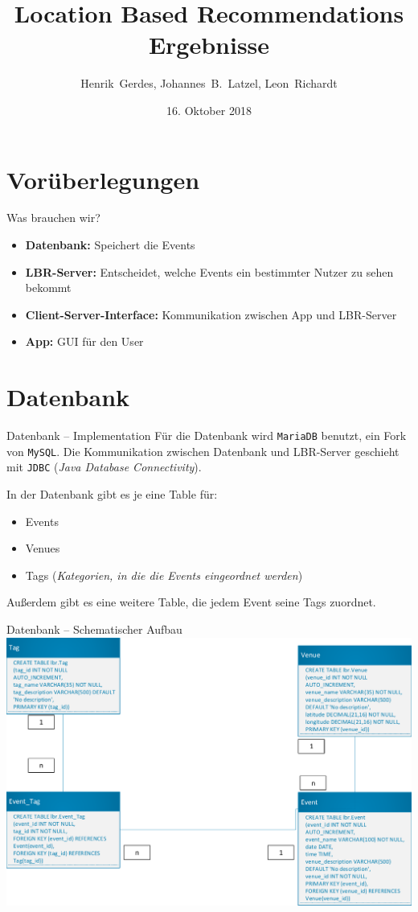 \documentclass{beamer}
\title{Location Based Recommendations\\Ergebnisse}
\author[H.~Gerdes, J.B.~Latzel, L.~Richardt]{Henrik~Gerdes, Johannes~B.~Latzel, Leon~Richardt}
\institute{Universität Osnabrück}
\date[16.10.2018]{16. Oktober 2018}
\begin{document}
	
	\begin{frame}
		\titlepage
	\end{frame}

	\section{Vorüberlegungen}
	\begin{frame}{Was brauchen wir?}
			\begin{itemize}
				\item \textbf{Datenbank:} Speichert die Events
				\item \textbf{LBR-Server:} Entscheidet, welche Events ein bestimmter Nutzer zu sehen bekommt
				\item \textbf{Client-Server-Interface:} Kommunikation zwischen App und LBR-Server
				\item \textbf{App:} GUI für den User
			\end{itemize}
	\end{frame}

	\section{Datenbank}
	\begin{frame}{Datenbank -- Implementation}
		Für die Datenbank wird \alert{\texttt{MariaDB}} benutzt, ein Fork von \texttt{MySQL}. Die Kommunikation zwischen Datenbank und LBR-Server geschieht mit \alert{\texttt{JDBC}} (\textit{Java Database Connectivity}).
		
		\pause
		In der Datenbank gibt es je eine Table für:
		\begin{itemize}
			\item Events
			\item Venues
			\item Tags (\textit{Kategorien, in die die Events eingeordnet werden})
		\end{itemize}
		Außerdem gibt es eine weitere Table, die jedem Event seine Tags zuordnet.
		
	\end{frame}

	\begin{frame}{Datenbank -- Schematischer Aufbau}
		\centering\includegraphics[scale=0.5]{db_scheme}
	\end{frame}
\end{document}
